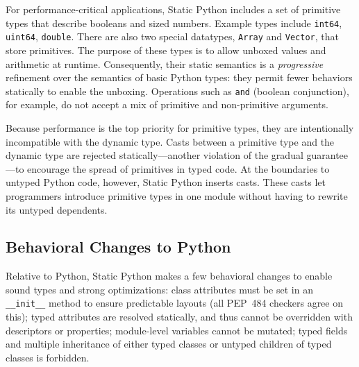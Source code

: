 \documentclass[english,cleveref,submission]{programming}
\newcommand{\SP}{Static Python}
\newcommand{\PEP}{PEP~484}
\newcommand{\code}[1]{\texttt{#1}}
\begin{document}

For performance-critical applications, \SP{} includes a set of primitive types
that describe booleans and sized numbers.
Example types include \code{int64}, \code{uint64}, \code{double}.
There are also two special datatypes, \code{Array} and \code{Vector}, that store primitives.
The purpose of these types is to allow unboxed values and arithmetic at
runtime.
Consequently, their static semantics is a \emph{progressive}~\cite{pqk-onward-2012}
refinement over the semantics of basic Python types:
they permit fewer behaviors statically to enable the unboxing.
Operations such as \code{and} (boolean conjunction), for example, do not accept
a mix of primitive and non-primitive arguments.

Because performance is the top priority for primitive types, they
are intentionally incompatible with the dynamic type.
Casts between a primitive type and the dynamic type are rejected
statically---another violation of the gradual guarantee---to encourage the
spread of primitives in typed code.
At the boundaries to untyped Python code, however, \SP{} inserts casts.
These casts let programmers introduce primitive types in one module
without having to rewrite its untyped dependents.





\subsection{Behavioral Changes to Python}
\label{s:not-python}

Relative to Python, \SP{} makes a few behavioral changes to enable
sound types and strong optimizations:
class attributes must be set in an \code{\_\_init\_\_} method to
ensure predictable layouts (all \PEP{} checkers agree on this);
typed attributes are resolved statically, and thus cannot be overridden with
descriptors or properties;
module-level variables cannot be mutated;
typed fields 
and
multiple inheritance of either typed classes or untyped children
of typed classes is forbidden.
\end{document}
